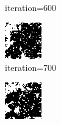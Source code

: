 \documentclass{article}
\begin{document}
\begin{figure}[h]
\begin{subfigure}[t]{0.18\textwidth}
\vspace{-0.6cm}
\caption{iteration=600}
\end{subfigure}\hspace{0.01\textwidth}
\begin{subfigure}[t]{0.18\textwidth}
\centering
\includegraphics[width=\textwidth]{./computational/results/gibbs_node_sampler_negative_iter_700.png}
\vspace{-0.6cm}
\caption{iteration=700}
\end{subfigure}\hspace{0.01\textwidth}
\begin{subfigure}[t]{0.18\textwidth}
\centering
\includegraphics[width=\textwidth]{./computational/results/gibbs_node_sampler_negative_iter_800.png}

\end{subfigure}
\end{figure}
\end{document}
